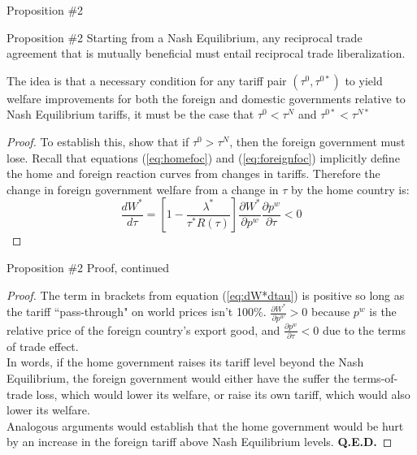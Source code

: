 \documentclass[aspectratio=169]{beamer}
\begin{document}
\begin{frame}{Proposition \#2}

\begin{theorem}{Proposition \#2}
    Starting from a Nash Equilibrium, any reciprocal trade agreement that is mutually beneficial must entail reciprocal trade liberalization.
\end{theorem}
The idea is that a necessary condition for any tariff pair $ \left( \tau^{0}, \tau^{0 *} \right) $ to yield welfare improvements for both the foreign and domestic governments relative to Nash Equilibrium tariffs, it must be the case that $ \tau^{0} < \tau^{N} $ and $ \tau^{0*} < \tau^{N*} $
\begin{proof}
    To establish this, show that if $ \tau^{0} > \tau^{N} $, then the foreign government must lose.  Recall that equations (\ref{eq:homefoc}) and (\ref{eq:foreignfoc}) implicitly define the home and foreign reaction curves from changes in tariffs.  Therefore the change in foreign government welfare from a change in $ \tau $  by the home country is:
    \begin{equation}
        \frac{d W^{*}}{d \tau} = \left[ 1 - \frac{\lambda^{*}}{\tau^{*} R\left( \tau \right)} \right] \frac{\partial W^{*}}{\partial p^{w}} \frac{\partial p^{w}}{\partial \tau} < 0
        \label{eq:dW*dtau}
    \end{equation}
\end{proof}

\end{frame}


\begin{frame}{Proposition \#2 Proof, continued}

\begin{proof}
    The term in brackets from equation (\ref{eq:dW*dtau}) is positive so long as the tariff ``pass-through" on world prices isn’t 100\%.  $ \frac{\partial W^{*}}{\partial p^{w}} > 0 $ because $ p^{w} $ is the relative price of the foreign country’s export good, and $ \frac{\partial p^{w}}{\partial \tau} < 0 $ due to the terms of trade effect. \\
    In words, if the home government raises its tariff level beyond the Nash Equilibrium, the foreign government would either have the suffer the terms-of-trade loss, which would lower its welfare, or raise its own tariff, which would also lower its welfare. \\
    Analogous arguments would establish that the home government would be hurt by an increase in the foreign tariff above Nash Equilibrium levels. \textbf{Q.E.D.}
\end{proof}
    
\end{frame}
\end{document}
